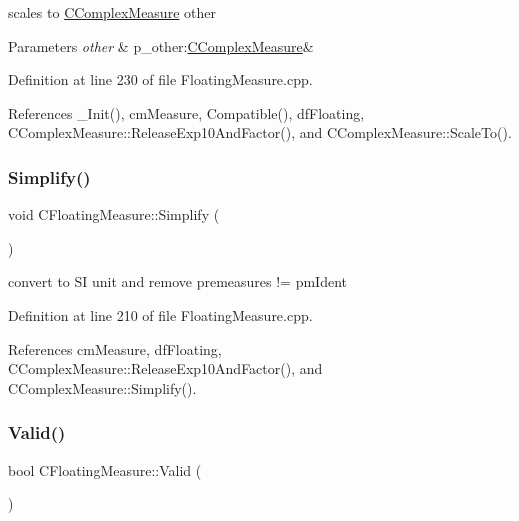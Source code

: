 scales to \hyperlink{classCComplexMeasure}{C\+Complex\+Measure} other 


\begin{DoxyParams}{Parameters}
{\em other} & p\+\_\+other\+:\hyperlink{classCComplexMeasure}{C\+Complex\+Measure}\& \\
\hline
\end{DoxyParams}


Definition at line 230 of file Floating\+Measure.\+cpp.



References \+\_\+\+Init(), cm\+Measure, Compatible(), df\+Floating, C\+Complex\+Measure\+::\+Release\+Exp10\+And\+Factor(), and C\+Complex\+Measure\+::\+Scale\+To().

\mbox{\label{classCFloatingMeasure_a47731afb871889ee7da5f84b40e3a27f}} 
\subsubsection{\texorpdfstring{Simplify()}{Simplify()}}
{\footnotesize\ttfamily void C\+Floating\+Measure\+::\+Simplify (\begin{DoxyParamCaption}{ }\end{DoxyParamCaption})}



convert to SI unit and remove premeasures != pm\+Ident 



Definition at line 210 of file Floating\+Measure.\+cpp.



References cm\+Measure, df\+Floating, C\+Complex\+Measure\+::\+Release\+Exp10\+And\+Factor(), and C\+Complex\+Measure\+::\+Simplify().

\mbox{\label{classCFloatingMeasure_a0ff3ae036cd2ee44d6b2eadc609b1d1a}} 
\subsubsection{\texorpdfstring{Valid()}{Valid()}}
{\footnotesize\ttfamily bool C\+Floating\+Measure\+::\+Valid (\begin{DoxyParamCaption}{ }\end{DoxyParamCaption})\hspace{0.3cm}{\ttfamily [inline]}}



